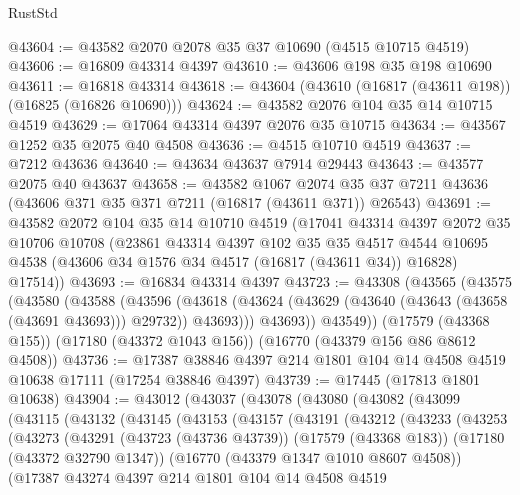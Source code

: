 \begin{lexlean}{RustStd}
\begin{coremodule}
{\begin{coremodule}
{{{{{{{{{{{{{{{{{{{{{{{{{{{{{{{{{{{{{{{{{{{{{{{{{{{{{{{@43604 := @43582 @2070 @2078 @35 @37 @10690 (@4515 @10715 @4519)
@43606 := @16809 @43314 @4397
@43610 := @43606 @198 @35 @198 @10690
@43611 := @16818 @43314
@43618 := @43604 (@43610 (@16817 (@43611 @198)) (@16825 (@16826 @10690)))
@43624 := @43582 @2076 @104 @35 @14 @10715 @4519
@43629 := @17064 @43314 @4397 @2076 @35 @10715
@43634 := @43567 @1252 @35 @2075 @40 @4508
@43636 := @4515 @10710 @4519
@43637 := @7212 @43636
@43640 := @43634 @43637 @7914 @29443
@43643 := @43577 @2075 @40 @43637
@43658 := @43582
    @1067
    @2074
    @35
    @37
    @7211
    @43636
    (@43606 @371 @35 @371 @7211 (@16817 (@43611 @371)) @26543)
@43691 := @43582
    @2072
    @104
    @35
    @14
    @10710
    @4519
    (@17041
      @43314
      @4397
      @2072
      @35
      @10706
      @10708
      (@23861
        @43314
        @4397
        @102
        @35
        @35
        @4517
        @4544
        @10695
        @4538
        (@43606 @34 @1576 @34 @4517 (@16817 (@43611 @34)) @16828)
        @17514))
@43693 := @16834 @43314 @4397
@43723 := @43308
    (@43565
      (@43575
        (@43580
          (@43588
            (@43596
              (@43618 (@43624 (@43629 (@43640 (@43643 (@43658 (@43691 @43693))) @29732)) @43693)))
            @43693))
        @43549))
    (@17579 (@43368 @155))
    (@17180 (@43372 @1043 @156))
    (@16770 (@43379 @156 @86 @8612 @4508))
@43736 := @17387 @38846 @4397 @214 @1801 @104 @14 @4508 @4519 @10638 @17111 (@17254 @38846 @4397)
@43739 := @17445 (@17813 @1801 @10638)
@43904 := @43012
    (@43037
      (@43078
        (@43080
          (@43082
            (@43099
              (@43115
                (@43132
                  (@43145
                    (@43153
                      (@43157
                        (@43191
                          (@43212
                            (@43233
                              (@43253
                                (@43273
                                  (@43291
                                    (@43723 (@43736 @43739))
                                    (@17579 (@43368 @183))
                                    (@17180 (@43372 @32790 @1347))
                                    (@16770 (@43379 @1347 @1010 @8607 @4508))
                                    (@17387
                                      @43274
                                      @4397
                                      @214
                                      @1801
                                      @104
                                      @14
                                      @4508
                                      @4519
}}}}}}}}}}}}}}}}}}}}}}}}}}}}}}}}}}}}}}}}}}}}}}}}}}}}}}}
\end{coremodule}}
\end{coremodule}
\end{lexlean}
